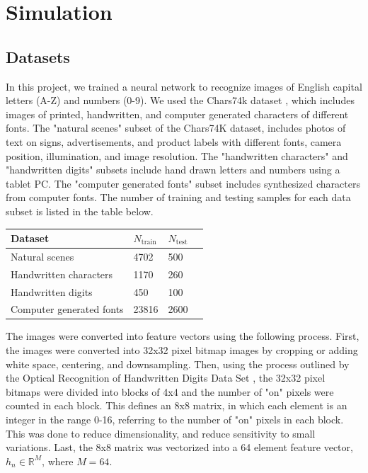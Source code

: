 \documentclass[journal,a4paper,onecolumn,11pt]{IEEEtran}
\begin{document}
\section{Simulation}

\subsection{Datasets}
In this project, we trained a neural network to recognize images of English capital letters (A-Z) and numbers (0-9). We used the Chars74k dataset \cite{bib:Chars74k}, which includes images of printed, handwritten, and computer generated characters of different fonts. The "natural scenes" subset of the Chars74K dataset, includes photos of text on signs, advertisements, and product labels with different fonts, camera position, illumination, and image resolution. The "handwritten characters" and "handwritten digits" subsets include hand drawn letters and numbers using a tablet PC. The "computer generated fonts" subset includes synthesized characters from computer fonts. The number of training and testing samples for each data subset is listed in the table below.

\begin{center}
    \begin{tabular}{ | l | l | l | p{5cm} |}
    \hline
    Dataset & $N_{\text{train}}$ & $N_{\text{test}}$ \\ \hline
    Natural scenes & 4702 & 500 \\ \hline
    Handwritten characters & 1170 & 260 \\ \hline
    Handwritten digits & 450 & 100 \\ \hline
    Computer generated fonts & 23816 & 2600 \\ \hline
    \end{tabular}
\end{center}

The images were converted into feature vectors using the following process. First, the images were converted into 32x32 pixel bitmap images by cropping or adding white space, centering, and downsampling. Then, using the process outlined by the Optical Recognition of Handwritten Digits Data Set \cite{bib:optdigits}, the 32x32 pixel bitmaps were divided into blocks of 4x4 and the number of "on" pixels were counted in each block. This defines an 8x8 matrix, in which each element is an integer in the range 0-16, referring to the number of "on" pixels in each block. This was done to reduce dimensionality, and reduce sensitivity to small variations. Last, the 8x8 matrix was vectorized into a 64 element feature vector, $h_n \in \mathbb{R}^{M}$, where $M=64$.
\end{document}
